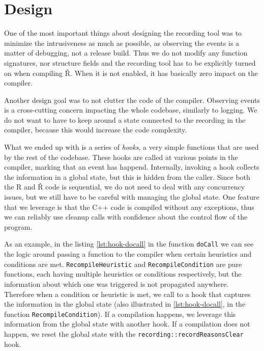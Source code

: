 \section{Design}

One of the most important things about designing the recording tool was to minimize the intrusiveness as much as possible, as observing the events is a matter of debugging, not a release build. Thus we do not modify any function signatures, nor structure fields and the recording tool has to be explicitly turned on when compiling Ř. When it is not enabled, it has basically zero impact on the compiler.

Another design goal was to not clutter the code of the compiler. Observing events is a cross-cutting concern impacting the whole codebase, similarly to logging. We do not want to have to keep around a state connected to the recording in the compiler, because this would increase the code complexity.

What we ended up with is a series of \textit{hooks}, a very simple functions that are used by the rest of the codebase. These hooks are called at various points in the compiler, marking that an event has happend. Internally, invoking a hook collects the information in a global state, but this is hidden from the caller. Since both the R and Ř code is sequential, we do not need to deal with any concurrency issues, but we still have to be careful with managing the global state. One feature that we leverage is that the C++ code is compiled without any exceptions, thus we can reliably use cleanup calls with confidence about the control flow of the program.

As an example, in the listing \ref{lst:hook-docall} in the function \texttt{doCall} we can see the logic around passing a function to the compiler when certain heuristics and conditions are met. \texttt{RecompileHeuristic} and \texttt{RecompileCondition} are pure functions, each having multiple heuristics or conditions respectively, but the information about which one was triggered is not propagated anywhere. Therefore when a condition or heuristic is met, we call to a hook that captures the information in the global state (also illustrated in \ref{lst:hook-docall}, in the function \texttt{RecompileCondition}). If a compilation happens, we leverage this information from the global state with another hook. If a compilation does not happen, we reset the global state with the \texttt{recording::recordReasonsClear} hook.

